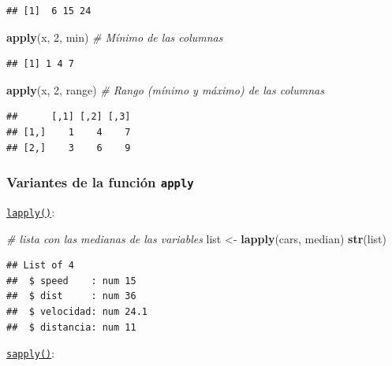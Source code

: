 \documentclass[
]{book}
\newenvironment{Shaded}{\begin{snugshade}}{\end{snugshade}}
\newcommand{\CommentTok}[1]{\textcolor[rgb]{0.56,0.35,0.01}{\textit{#1}}}
\newcommand{\DecValTok}[1]{\textcolor[rgb]{0.00,0.00,0.81}{#1}}
\newcommand{\FunctionTok}[1]{\textcolor[rgb]{0.13,0.29,0.53}{\textbf{#1}}}
\newcommand{\NormalTok}[1]{#1}
\newcommand{\OtherTok}[1]{\textcolor[rgb]{0.56,0.35,0.01}{#1}}
\begin{document}
\begin{verbatim}
## [1]  6 15 24
\end{verbatim}

\begin{Shaded}
\begin{Highlighting}[]
\FunctionTok{apply}\NormalTok{(x, }\DecValTok{2}\NormalTok{, min)    }\CommentTok{\# Mínimo de las columnas}
\end{Highlighting}
\end{Shaded}

\begin{verbatim}
## [1] 1 4 7
\end{verbatim}

\begin{Shaded}
\begin{Highlighting}[]
\FunctionTok{apply}\NormalTok{(x, }\DecValTok{2}\NormalTok{, range)  }\CommentTok{\# Rango (mínimo y máximo) de las columnas}
\end{Highlighting}
\end{Shaded}

\begin{verbatim}
##      [,1] [,2] [,3]
## [1,]    1    4    7
## [2,]    3    6    9
\end{verbatim}

\subsubsection{\texorpdfstring{Variantes de la función \texttt{apply}}{Variantes de la función apply}}\label{variantes-de-la-funciuxf3n-apply}

\href{https://www.rdocumentation.org/packages/base/versions/3.6.1/topics/lapply}{\texttt{lapply()}}:

\begin{Shaded}
\begin{Highlighting}[]
\CommentTok{\# lista con las medianas de las variables}
\NormalTok{list }\OtherTok{\textless{}{-}} \FunctionTok{lapply}\NormalTok{(cars, median)}
\FunctionTok{str}\NormalTok{(list)}
\end{Highlighting}
\end{Shaded}

\begin{verbatim}
## List of 4
##  $ speed    : num 15
##  $ dist     : num 36
##  $ velocidad: num 24.1
##  $ distancia: num 11
\end{verbatim}

\href{https://www.rdocumentation.org/packages/base/versions/3.6.1/topics/sapply}{\texttt{sapply()}}:
\end{document}
